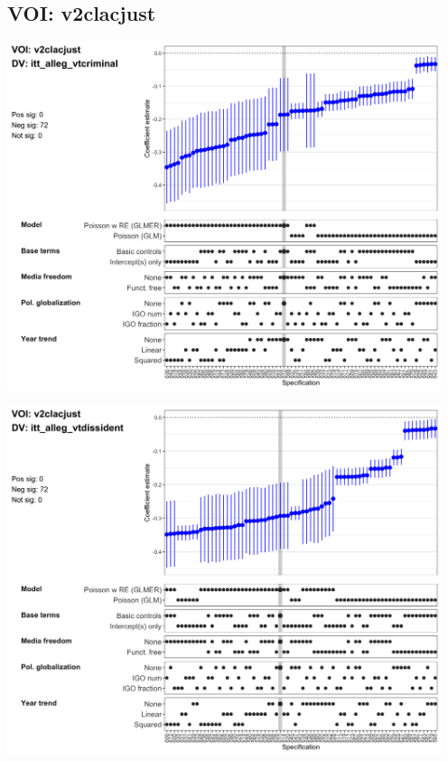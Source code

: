 \documentclass[]{article}
\begin{document}
\hypertarget{voi-v2clacjust}{%
\subsection{VOI: v2clacjust}\label{voi-v2clacjust}}

\includegraphics[height=4in]{../output/figures-robustness/specplot-v2clacjust-itt_alleg_vtcriminal.png}

\includegraphics[height=4in]{../output/figures-robustness/specplot-v2clacjust-itt_alleg_vtdissident.png}
\end{document}
